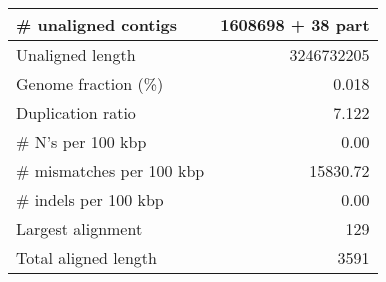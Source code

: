 \documentclass[12pt,a4paper]{article}
\begin{document}
\begin{table}[ht]
\begin{center}
\begin{tabular}{|l*{1}{|r}|}
\# unaligned contigs & 1608698 + 38 part \\ \hline
Unaligned length & 3246732205 \\ \hline
Genome fraction (\%) & 0.018 \\ \hline
Duplication ratio & 7.122 \\ \hline
\# N's per 100 kbp & 0.00 \\ \hline
\# mismatches per 100 kbp & 15830.72 \\ \hline
\# indels per 100 kbp & 0.00 \\ \hline
Largest alignment & 129 \\ \hline
Total aligned length & 3591 \\ \hline
\end{tabular}
\end{center}
\end{table}
\end{document}
